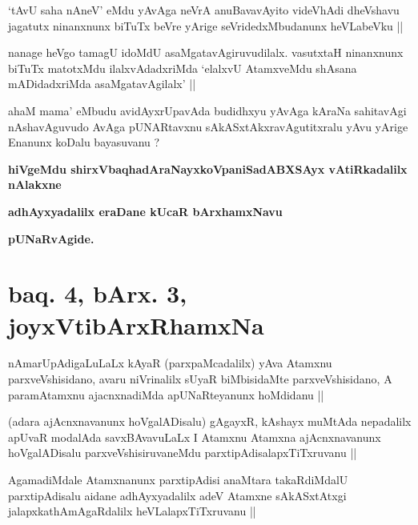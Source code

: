 
\begin{artha}
`tAvU saha nAneV' eMdu yAvAga neVrA anuBavavAyito videVhAdi dheVshavu jagatutx ninanxnunx biTuTx beVre yArige seVridedxMbudanunx heVLabeVku ||
\end{artha}


\begin{artha}
nanage heVgo tamagU idoMdU asaMgatavAgiruvudilalx. vasutxtaH ninanxnunx biTuTx matotxMdu ilalxvAdadxriMda `elalxvU AtamxveMdu shAsana mADidadxriMda asaMgatavAgilalx' ||
\end{artha}

\begin{artha}
ahaM mama' eMbudu avidAyxrUpavAda budidhxyu yAvAga kAraNa sahitavAgi nAshavAguvudo AvAga pUNARtavxnu sAkASxtAkxravAgutitxralu yAvu yArige Enanunx koDalu bayasuvanu ?
\end{artha}

\begin{center}
{\bf hiVgeMdu shirxVbaqhadAraNayxkoVpaniSadABXSAyx vAtiRkadalilx nAlakxne}

\smallskip
{\bf adhAyxyadalilx eraDane kUcaR bArxhamxNavu}

\smallskip
{\bf pUNaRvAgide.}
\end{center}

\section*{baq. 4, bArx. 3, joyxVtibArxRhamxNa}


\begin{artha}
nAmarUpAdigaLuLaLx kAyaR (parxpaMcadalilx) yAva Atamxnu parxveVshisidano, avaru niVrinalilx sUyaR biMbisidaMte parxveVshisidano, A paramAtamxnu ajacnxnadiMda apUNaRteyanunx hoMdidanu ||
\end{artha}

\begin{artha}
(adara ajAcnxnavanunx hoVgalADisalu) gAgayxR, kAshayx muMtAda nepadalilx apUvaR modalAda savxBAvavuLaLx I Atamxnu Atamxna ajAcnxnavanunx hoVgalADisalu parxveVshisiruvaneMdu parxtipAdisalapxTiTxruvanu ||
\end{artha}

\begin{artha}
AgamadiMdale Atamxnanunx parxtipAdisi anaMtara takaRdiMdalU parxtipAdisalu aidane adhAyxyadalilx adeV Atamxne sAkASxtAtxgi jalapxkathAmAgaRdalilx heVLalapxTiTxruvanu ||
\end{artha}

